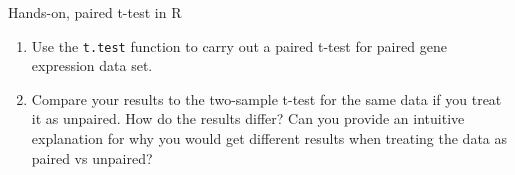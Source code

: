 \documentclass[presentation]{beamer}
\begin{document}
\begin{frame}[fragile,label={sec:org4a8bb79}]{Hands-on, paired t-test in R}
 \begin{enumerate}
\item Use the \texttt{t.test} function to carry out a paired t-test for paired gene expression data set.
\item Compare your results to the two-sample t-test for the same data if you treat it as unpaired. How do the results differ?  Can you provide an intuitive explanation for why you would get different results when treating the data as paired vs unpaired?
\end{enumerate}
\end{frame}
\end{document}
